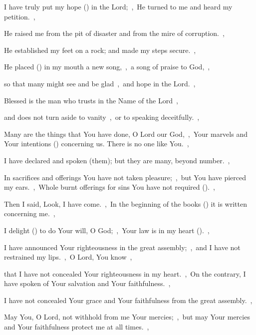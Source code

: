 \documentclass[12pt,twoside,a5paper]{article}
\begin{document}
\begin{normalparskip}
  I have truly put my hope () in the Lord;~\sep\ He turned to me and heard my petition.~\sep


  He raised me from the pit of disaster and from the mire of corruption.~\sep

  He established my feet on a rock; and made my steps secure.~\sep

  He placed () in my mouth a new song,~\sep\ a song of praise to God,~\sep

  so that many might see and be glad~\sep\ and hope in the Lord.~\sep

  Blessed is the man who trusts in the Name of the Lord~\sep

  and does not turn aside to vanity~\sep\ or to speaking deceitfully.~\sep

  Many are the things that You have done, O Lord our God,~\sep\ Your marvels and Your intentions () concerning us. There is no one like You.~\sep

  I have declared and spoken (them); but they are many, beyond number.~\sep

  In sacrifices and offerings You have not taken pleasure;~\sep\ but You have pierced my ears.~\sep\ Whole burnt offerings for sins You have not required ().~\sep

  Then I said, Look, I have come.~\sep\ In the beginning of the books () it is written concerning me.~\sep

  I delight () to do Your will, O God;~\sep\ Your law is in my heart ().~\sep

  I have announced Your righteousness in the great assembly;~\sep\ and I have not restrained my lips.~\sep\ O Lord, You know~\sep

  that I have not concealed Your righteousness in my heart.~\sep\ On the contrary, I have spoken of Your salvation and Your faithfulness.~\sep

  I have not concealed Your grace and Your faithfulness from the great assembly.~\sep

  May You, O Lord, not withhold from me Your mercies;~\sep\ but may Your mercies and Your faithfulness protect me at all times.~\sep


\end{normalparskip}
\end{document}
